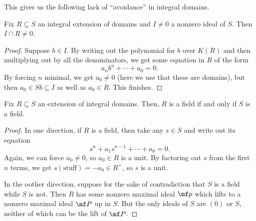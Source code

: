This gives us the following lack of ``avoidance'' in integral domains.
\begin{prop}
	Fix $R\subseteq S$ an integral extension of domains and $I\ne0$ a nonzero ideal of $S$. Then $I\cap R\ne0$.
\end{prop}
\begin{proof}
	Suppose $b\in I$. By writing out the polynomial for $b$ over $K(R)$ and then multiplying out by all the denominators, we get some equation in $R$ of the form
	\[a_nb^n+\cdots+a_0=0.\]
	By forcing $n$ minimal, we get $a_0\ne0$ (here we use that these are domains), but then $a_0\in Sb\subseteq I$ as well as $a_0\in R$. This finishes.
\end{proof}
\begin{proposition}
	Fix $R\subseteq S$ an extension of integral domains. Then, $R$ is a field if and only if $S$ is a field.
\end{proposition}
\begin{proof}
	In one direction, if $R$ is a field, then take any $s\in S$ and write out its equation
	\[s^n+a_1s^{n-1}+\cdots+a_0=0.\]
	Again, we can force $a_0\ne0$, so $a_0\in R$ is a unit. By factoring out $s$ from the first $n$ terms, we get $s(\text{stuff})=-a_0\in R^\times$, so $s$ is a unit.

	In the oother direction, suppose for the sake of contradiction that $S$ is a field while $S$ is not. Then $R$ has some nonzero maximal ideal $\mf p$ which lifts to a nonzero maximal ideal $\mf P$ up in $S$. But the only ideals of $S$ are $(0)$ or $S$, neither of which can be the lift of $\mf P$.
\end{proof}